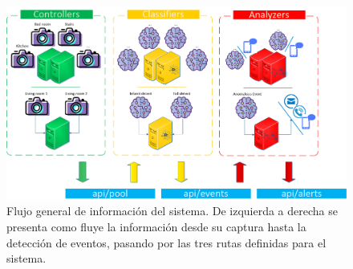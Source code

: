         \begin{figure}[ht!]
        	\centering
        	\includegraphics[width=0.8\linewidth]{imgs/03-Architecture/03-Communication.png}
        	\caption[Flujo general de información del sistema]{Flujo general de información del sistema. De izquierda a derecha se presenta como fluye la información desde su captura hasta la detección de eventos, pasando por las tres rutas definidas para el sistema.}
    	    \label{fig:ModuleComunication}
        \end{figure}%
        
